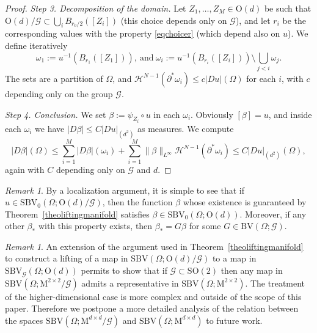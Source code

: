 \documentclass[a4paper,reqno]{amsart}
\newcommand{\BV}{\mathrm{BV}}
\newcommand{\SBV}{\mathrm{SBV}}
\newcommand{\SBVG}{\mathrm{SBV}_{\mathcal{G}}}
\newcommand\calH{\mathcal{H}}
\newcommand\SO{{\mathrm{SO}}}
\theoremstyle{remark}
\newtheorem{remark}[definition]{Remark}
\newcommand{\G}{\mathcal{G}}
\newcommand{\On}{\mathrm{O}(d)}
\newcommand{\OnG}{{\On}/{\G}}
\newcommand{\Mno}{\mathrm{M}^{d\times d}}
\newcommand{\Mdue}{\mathrm{M}^{2\times 2}}
\newcommand{\PC}{\mathrm{SBV}_0}
\numberwithin{equation}{section}
\begin{document}
\begin{proof}
\emph{Step 3. Decomposition of the domain.}
Let $Z_1, \dots, Z_M\in \On$ be such that $\OnG\subset \bigcup_i B_{r_0/2}([Z_i])$
(this choice depends only on $\G$), and let $r_i$ be the corresponding values with the property \eqref{eqchoicer} (which depend also on $u$).
We define iteratively 
\[
\omega_1:= u^{-1}(B_{r_1}([Z_1])),\
\text{and}\ \omega_i:= u^{-1}(B_{r_i}([Z_i]))\setminus \bigcup_{j<i} \omega_j.
\]
The sets are a partition of $\Omega$,
and $\calH^{N-1}(\partial^*\omega_i)\le c |Du|(\Omega)$ for each $i$, with $c$ depending only on the group $\G$.

\emph{Step 4. Conclusion.}
We set $\beta:=\psi_{Z_i}\circ u$ in each $\omega_i$. Obviously $[\beta]=u$,
and inside each $\omega_i$ we have $|D\beta|\le C|Du|_{(d^2)}$ as measures.
We compute
\begin{equation}
 |D\beta|(\Omega)\le \sum_{i=1}^M |D\beta|(\omega_i)+ \sum_{i=1}^M\|\beta\|_{L^\infty} \calH^{N-1}(\partial^*\omega_i) \le C |Du|_{(d^2)}(\Omega),
\end{equation}
again with $C$ depending only on $\G$ and $d$.
\end{proof}


\begin{remark}\label{rem:0904251748}
	By a localization argument, it is simple to see that if $u\in \PC(\Omega;\On/\G)$, then the function $\beta$ whose existence is guaranteed by
	Theorem~\ref{theoliftingmanifold} satisfies $\beta \in \PC(\Omega; \On)$. Moreover, if any other $\beta_*$ with this property exists, then $\beta_*=G\beta$ for some $G\in \BV(\Omega;\G)$.
\end{remark}


\begin{remark}\label{ref:lifting}
An extension of the argument used in Theorem~\ref{theoliftingmanifold} to construct a lifting of a map in
 $\SBV(\Omega;\OnG)$  to a map in   $\SBVG(\Omega;\On)$ permits to show
 that if $\G\subset\SO(2)$ then any map in
 $\SBV(\Omega;\Mdue/\G)$ admits a representative in  $\SBV(\Omega;\Mdue)$.
 The treatment of the higher-dimensional case is more complex and outside of the scope of this paper. Therefore we postpone a more detailed analysis of the relation between the spaces
 $\SBV(\Omega;\Mno/\G)$ and $\SBV(\Omega;\Mno)$ to future work.
\end{remark}
\end{document}
